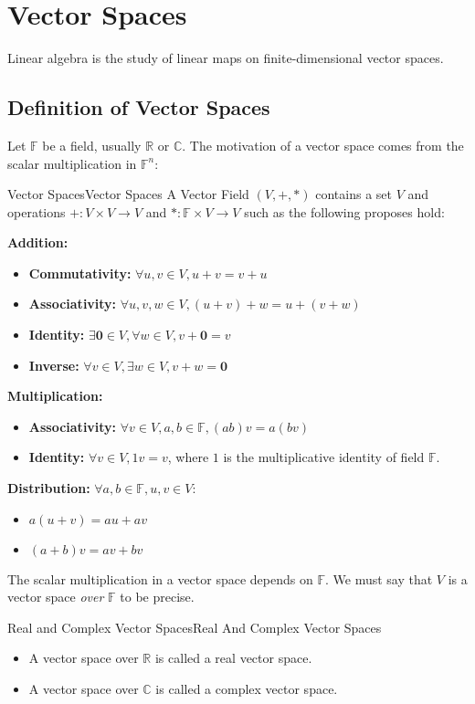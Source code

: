 \documentclass[../main.tex]{subfiles}
\begin{document}
\chapter{Vector Spaces}

Linear algebra is the study of linear maps on finite-dimensional vector spaces.

\section{Definition of Vector Spaces}
Let $\mathbb{F}$ be a field, usually $\mathbb{R}$ or $\mathbb{C}$. The motivation of a vector space comes from the scalar multiplication in $\mathbb{F}^{n}$: 
\begin{definition}{Vector Spaces}{Vector Spaces}
A Vector Field $(V,+,*)$ contains a set $V$ and operations $+:V \times V \rightarrow  V$ and $*: \mathbb{F} \times V \rightarrow  V$ such as the following proposes hold:

\textbf{Addition:}
\begin{itemize}
\item \textbf{Commutativity: } $\forall u,v \in V,u+v=v+u$
\item \textbf{Associativity: } $\forall u,v,w \in V, \left(u+v\right)+w = u+\left(v+w\right)$ 
\item \textbf{Identity: } $\exists \boldsymbol{0} \in V, \forall w \in V, v+ \boldsymbol{0}=v$ 
\item \textbf{Inverse: } $\forall v \in V, \exists w \in V, v+w= \boldsymbol{0}$
\end{itemize}

\textbf{Multiplication: }
\begin{itemize}
\item \textbf{Associativity: } $\forall v \in V, a,b \in \mathbb{F}, (ab)v=a(bv)$
\item \textbf{Identity: } $\forall v \in V,1v=v$, where $1$ is the multiplicative identity of field $\mathbb{F}$.
\end{itemize}

\textbf{Distribution: }$\forall a,b \in \mathbb{F},u,v \in V$:
\begin{itemize}
\item $a(u+v)=au+av$
\item  $(a+b)v=av+bv$
\end{itemize}
\end{definition}

The scalar multiplication in a vector space depends on $\mathbb{F}$. We must say that $V$ is a vector space \emph{over} $\mathbb{F}$ to be precise.
\begin{definition}{Real and Complex Vector Spaces}{Real And Complex Vector Spaces}
\begin{itemize}
\item A vector space over $\mathbb{R}$ is called a real vector space.
\item A vector space over $\mathbb{C}$ is called a complex vector space.
\end{itemize}
\end{definition}
\end{document}
